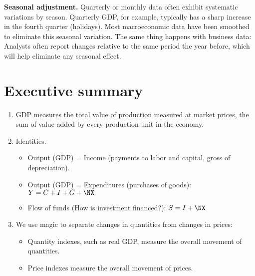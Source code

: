 \textbf{Seasonal adjustment.} Quarterly or monthly data often exhibit systematic variations by season.
Quarterly GDP, for example, typically has a sharp increase in the fourth quarter
(holidays).
Most macroeconomic data have been smoothed to eliminate this seasonal variation.
The same thing happens with business data: Analysts often report changes relative to the same period the year before,
which will help eliminate any seasonal effect.



\section*{Executive summary}

\setlength{\leftmargini}{.5\oldleftmargini}
\begin{enumerate}
\item GDP measures the total value of production measured at market prices,
the sum of value-added by every production unit in the economy.

\item Identities.

   \begin{itemize}

   \item Output (GDP) = Income (payments to labor and capital,
   gross of depreciation).

   \item Output (GDP) = Expenditures (purchases of goods):  $Y = C+I+G+\NX$

   \item Flow of funds (How is investment financed?):  $S =I + \NX$

   \end{itemize}

\item We use magic to separate changes in quantities from changes in prices:
\begin{itemize}
\item Quantity indexes, such as real GDP, measure the overall movement of quantities.
\item Price indexes measure the overall movement of prices.
\end{itemize}

\end{enumerate}
\setlength{\leftmargini}{\oldleftmargini}


